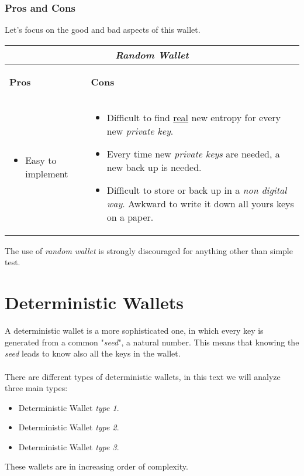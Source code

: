 \subsubsection{Pros and Cons}
Let's focus on the good and bad aspects of this wallet.

\begin{center}
	\begin{tabular}{ |p{6cm}|p{6cm}|  }
		\hline
		\multicolumn{2}{|c|}{\textbf{\textit{Random Wallet}}} \\
		\hline \hline 
		\begin{center}
			\textbf{Pros}
		\end{center}&\begin{center}
			\textbf{Cons}
		\end{center}\\
		\hline
		\begin{itemize}
			\item Easy to implement
		\end{itemize} &
		\begin{itemize}
			\item Difficult to find \underline{real} new entropy for every new \textit{private key}.
			\item Every time new \textit{private keys} are needed, a new back up is needed.
			\item Difficult to store or back up in a \textit{non digital way}. Awkward to write it down all yours keys on a paper.
		\end{itemize}\\
		\hline
	\end{tabular}
\end{center}
The use of \textit{random wallet} is strongly discouraged for anything other than simple test.

\section{Deterministic Wallets}
A deterministic wallet is a more sophisticated one, in which every key is generated from a common "\textit{seed}", a natural number. This means that knowing the \textit{seed} leads to know also all the keys in the wallet.\\ \\
There are different types of deterministic wallets, in this text we will analyze three main types:
\begin{itemize}
	\item Deterministic Wallet \textit{type 1}.
	\item Deterministic Wallet \textit{type 2}.
	\item Deterministic Wallet \textit{type 3}.
\end{itemize}
These wallets are in increasing order of complexity.

